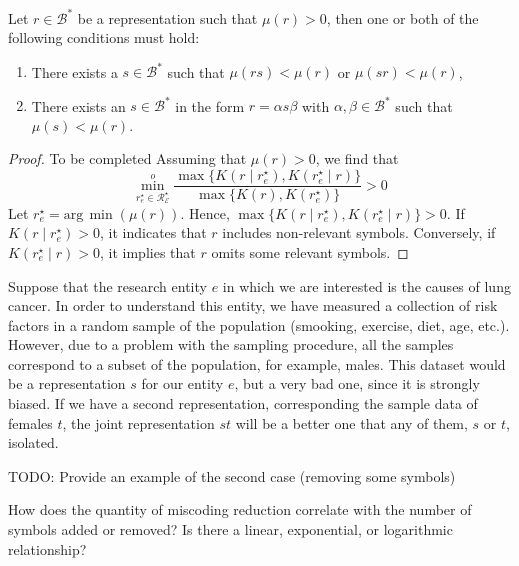 \begin{theorem}
\label{th:reduce_miscoding}
Let $r \in \mathcal{B}^\ast$ be a representation such that $\mu(r) >0$, then one or both of the following conditions must hold:
\begin{enumerate}[label=(\roman*)]
\item There exists a $s \in \mathcal{B}^\ast$ such that $\mu(rs) < \mu(r)$ or $\mu(sr) < \mu(r)$,
\item There exists an $s \in \mathcal{B}^\ast$ in the form $r = \alpha s \beta$ with $\alpha, \beta \in \mathcal{B}^\ast$ such that $\mu(s) < \mu(r)$.
\end{enumerate}
\end{theorem}
\begin{proof}
{\color{red} To be completed}
Assuming that $\mu(r) >0$, we find that
\[
\overset{o}{ \underset{ r^\star_e \in \mathcal{R}^\star_\mathcal{E} } \min} \frac{ \max\{ K \left( r \mid r^\star_e \right), K \left( r^\star_e \mid r \right) \} } { \max\{ K \left( r \right), K \left( r^\star_e \right) \} } > 0
\]
Let $r^\star_e = \text{arg}\,\min \left( \mu(r) \right)$. Hence, $\max\{ K \left( r \mid r^\star_e \right), K \left( r^\star_e \mid r \right) \} > 0$. If $K \left( r \mid r^\star_e \right) > 0$, it indicates that $r$ includes non-relevant symbols. Conversely, if $K \left( r^\star_e \mid r \right) > 0$, it implies that $r$ omits some relevant symbols.
\end{proof}

\begin{example}
\label{ex:lung_cancer}
Suppose that the research entity $e$ in which we are interested is the causes of lung cancer. In order to understand this entity, we have measured a collection of risk factors in a random sample of the population (smooking, exercise, diet, age, etc.). However, due to a problem with the sampling procedure, all the samples correspond to a subset of the population, for example, males. This dataset would be a representation $s$ for our entity $e$, but a very bad one, since it is strongly biased. If we have a second representation, corresponding the sample data of females $t$, the joint representation $st$ will be a better one that any of them, $s$ or $t$, isolated.
\end{example}

{\color{red} TODO: Provide an example of the second case (removing some symbols)}

{\color{red} How does the quantity of miscoding reduction correlate with the number of symbols added or removed? Is there a linear, exponential, or logarithmic relationship?}

